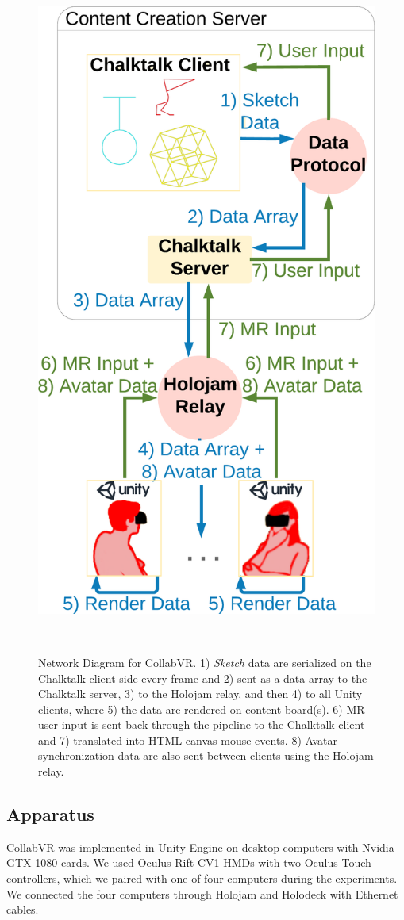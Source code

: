 \documentclass[chi_draft]{sigchi}
\begin{document}
\begin{figure}[h]
 \centering
 \includegraphics[width=0.75\columnwidth]{dataflow}
 \caption{Network Diagram for CollabVR. 
 1) \textit{Sketch} data are serialized on the Chalktalk client side every frame and 2) sent as a data array to the Chalktalk server, 3) to the Holojam relay, and then 4) to all Unity clients, where 5) the data are rendered on content board(s). 6) MR user input is sent back through the pipeline to the Chalktalk client and 7) translated into HTML canvas mouse events. 8) Avatar synchronization data are also sent between clients using the Holojam relay.}~\label{fig:datapipeline}
\end{figure}

\subsection{Apparatus}
CollabVR was implemented in Unity Engine on desktop computers with Nvidia GTX 1080 cards. We used Oculus Rift CV1 HMDs with two Oculus Touch controllers, which we paired with one of four computers during the experiments. We connected the four computers through Holojam and Holodeck with Ethernet cables.
\end{document}
